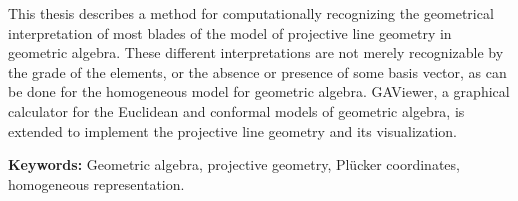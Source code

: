 This thesis describes a method for computationally recognizing the geometrical interpretation of most blades of the model of projective line geometry in geometric algebra.  These different interpretations are not merely recognizable by the grade of the elements, or the absence or presence of some basis vector, as can be done for the homogeneous model for geometric algebra.  GAViewer, a graphical calculator for the Euclidean and conformal models of geometric algebra, is extended to implement the projective line geometry and its visualization.

\textbf{Keywords:} Geometric algebra, projective geometry, Pl\"ucker coordinates, homogeneous representation.
